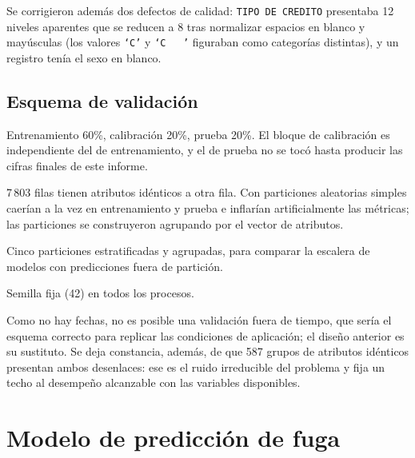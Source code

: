 \documentclass[11pt,a4paper]{article}
\newcommand{\T}[1]{}
\begin{document}
\begin{table}[H]\centering\small
\caption{Decisión adoptada sobre cada variable y su justificación.}
\T{auditoria}
\end{table}

\noindent Se corrigieron además dos defectos de calidad: \texttt{TIPO DE CREDITO}
presentaba 12 niveles aparentes que se reducen a 8 tras normalizar espacios en
blanco y mayúsculas (los valores \texttt{`C'} y \texttt{`C~~~'} figuraban como
categorías distintas), y un registro tenía el sexo en blanco.

\subsection{Esquema de validación}
\label{sec:validacion}

\begin{description}[leftmargin=1.4em,style=nextline,nosep]
\item[Tres bloques disjuntos] Entrenamiento 60\%, calibración 20\%, prueba 20\%.
      El bloque de calibración es independiente del de entrenamiento, y el de
      prueba no se tocó hasta producir las cifras finales de este informe.
\item[Agrupación por vector de atributos] 7\,803 filas tienen atributos idénticos
      a otra fila. Con particiones aleatorias simples caerían a la vez en
      entrenamiento y prueba e inflarían artificialmente las métricas; las
      particiones se construyeron agrupando por el vector de atributos.
\item[Validación cruzada] Cinco particiones estratificadas y agrupadas, para
      comparar la escalera de modelos con predicciones fuera de partición.
\item[Reproducibilidad] Semilla fija (42) en todos los procesos.
\end{description}

\noindent Como no hay fechas, no es posible una validación fuera de tiempo, que
sería el esquema correcto para replicar las condiciones de aplicación; el diseño
anterior es su sustituto. Se deja constancia, además, de que 587 grupos de
atributos idénticos presentan ambos desenlaces: ese es el ruido irreducible del
problema y fija un techo al desempeño alcanzable con las variables disponibles.

\section{Modelo de predicción de fuga}
\end{document}
